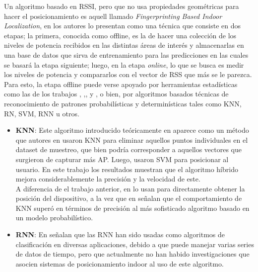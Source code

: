 \begin{enumerate}
{\begin{itemize}
{        Un algoritmo basado en \ac{RSSI}, pero que no usa propiedades geométricas para hacer el posicionamiento es aquell llamado \textit{Fingerprinting Based Indoor Localization}, en \cite{6} los autores lo presentan como una técnica que consiste en dos etapas; la primera, conocida como offline, es la de hacer una colección de los niveles de potencia recibidos en las distintas áreas de interés y almacenarlas en una base de datos que sirva de entrenamiento para las predicciones en las cuales se basará la etapa siguiente; luego, en la etapa \textit{online}, lo que se busca es medir los niveles de potencia y compararlos con el vector de \ac{RSS} que más se le parezca.\\
        
        Para esto, la etapa offline puede verse apoyado por herramientas estadísticas como las de los trabajos \cite{8}, \cite{10},\cite{11},\cite{12} y \cite{14}, o bien, por algoritmos basados técnicas de reconocimiento de patrones probabilísticas y determinísticas tales como KNN, RN, SVM, RNN u otros.\\
        
        \begin{itemize}
            \item {\textbf{\ac{KNN}}: Este algoritmo introducido teóricamente en \cite{7} aparece como un método que autores en \cite{23} usaron KNN para eliminar aquellos puntos individuales en el dataset de muestreo, que bien podría corresponder a aquellos vectores que surgieron de capturar más AP. Luego, usaron SVM para posicionar al usuario. En este trabajo los resultados muestran que el algoritmo híbrido mejora considerablemente la precisión y la velocidad de este.\\
            
            A diferencia de el trabajo anterior, en \cite{24} lo usan para directamente obtener la posición del dispositivo, a la vez que en \cite{25} señalan que el comportamiento de KNN superó en términos de precisión al más sofisticado algoritmo basado en un modelo probabilístico.\\}
            
            \item {\textbf{\ac{RNN}}: \label{RNN} En \cite{15} señalan que las RNN han sido usadas como algoritmos de clasificación en diversas aplicaciones, debido a que puede manejar varias series de datos de tiempo, pero que actualmente no han habido investigaciones que asocien sistemas de posicionamiento indoor al uso de este algoritmo.\\
            
}
\end{itemize}}
\end{itemize}}
\end{enumerate}
